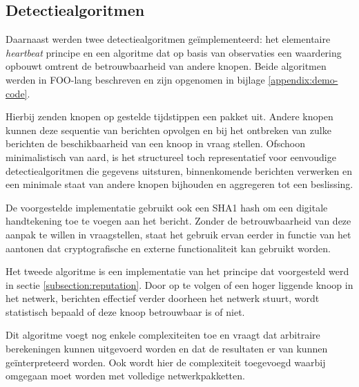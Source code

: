 \subsection{Detectiealgoritmen}
\label{subsection:eval-algorithms}

Daarnaast werden twee detectiealgoritmen ge\"implementeerd: het elementaire
\emph{heartbeat} principe en een algoritme dat op basis van observaties een
waardering opbouwt omtrent de betrouwbaarheid van andere knopen. Beide
algoritmen werden in FOO-lang beschreven en zijn opgenomen in bijlage
\ref{appendix:demo-code}.

\begin{description}[noitemsep, topsep=0pt, partopsep=1pt]

  \item[\emph{Heartbeat}] Hierbij zenden knopen op gestelde tijdstippen een
  pakket uit. Andere knopen kunnen deze sequentie van berichten opvolgen en bij
  het ontbreken van zulke berichten de beschikbaarheid van een knoop in vraag
  stellen. Ofschoon minimalistisch van aard, is het structureel toch
  representatief voor eenvoudige detectiealgoritmen die gegevens uitsturen,
  binnenkomende berichten verwerken en een minimale staat van andere knopen
  bijhouden en aggregeren tot een beslissing.

  De voorgestelde implementatie gebruikt ook een SHA1 hash \citep{rfc:3174} om
  een digitale handtekening toe te voegen aan het bericht. Zonder de
  betrouwbaarheid van deze aanpak te willen in vraagstellen, staat het gebruik
  ervan eerder in functie van het aantonen dat cryptografische en externe
  functionaliteit kan gebruikt worden.

  \item[Reputatie] Het tweede algoritme is een implementatie van het principe
  dat voorgesteld werd in sectie \ref{subsection:reputation}. Door op te volgen
  of een hoger liggende knoop in het netwerk, berichten effectief verder
  doorheen het netwerk stuurt, wordt statistisch bepaald of deze knoop
  betrouwbaar is of niet.

  Dit algoritme voegt nog enkele complexiteiten toe en vraagt dat arbitraire
  berekeningen kunnen uitgevoerd worden en dat de resultaten er van kunnen
  ge\"interpreteerd worden. Ook wordt hier de complexiteit toegevoegd waarbij
  omgegaan moet worden met volledige netwerkpakketten.

\end{description}

\vspace{-3mm}

